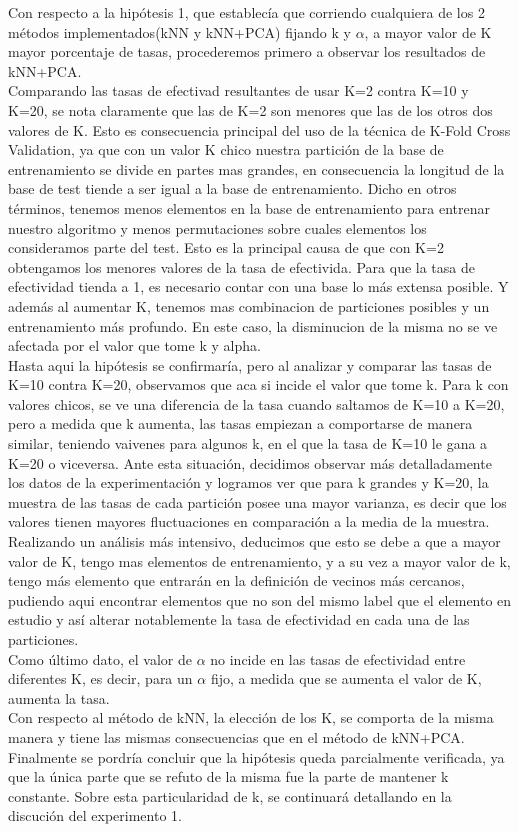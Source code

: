 Con respecto a la hipótesis 1, que establecía que corriendo cualquiera de los 2 métodos implementados(kNN y kNN+PCA) fijando k y $\alpha$, a mayor valor de K mayor porcentaje de tasas, procederemos primero a observar los resultados de kNN+PCA.\\ Comparando las tasas de efectivad resultantes de usar K=2 contra K=10 y K=20, se nota claramente que las de K=2 son menores que las de los otros dos valores de K. Esto es consecuencia principal del uso de la técnica de K-Fold Cross Validation, ya que con un valor K chico nuestra partición de la base de entrenamiento se divide en partes mas grandes, en consecuencia la longitud de la base de test tiende a ser igual a la base de entrenamiento. Dicho en otros términos, tenemos menos elementos en la base de entrenamiento para entrenar nuestro algoritmo y menos permutaciones sobre cuales elementos los consideramos parte del test. Esto es la principal causa de que con K=2 obtengamos los menores valores de la tasa de efectivida. Para que la tasa de efectividad tienda a 1, es necesario contar con una base lo más extensa posible. Y además al aumentar K, tenemos mas combinacion de particiones posibles y un entrenamiento más profundo. En este caso, la disminucion de la misma no se ve afectada por el valor que tome k y alpha. \\Hasta aqui la hipótesis se confirmaría, pero al analizar y comparar las tasas de K=10 contra K=20, observamos que aca si incide el valor que tome k. Para k con valores chicos, se ve una diferencia de la tasa cuando saltamos de K=10 a K=20, pero a medida que k aumenta, las tasas empiezan a comportarse de manera similar, teniendo vaivenes para algunos k, en el que la tasa de K=10 le gana a K=20 o viceversa. Ante esta situación, decidimos observar más detalladamente los datos de la experimentación y logramos ver que para k grandes y K=20, la muestra de las tasas de cada partición posee una mayor varianza, es decir que los valores tienen mayores fluctuaciones en comparación a la media de la muestra. Realizando un análisis más intensivo, deducimos que esto se debe a que a mayor valor de K, tengo mas elementos de entrenamiento, y a su vez a mayor valor de k, tengo más elemento que entrarán en la definición de vecinos más cercanos, pudiendo aqui encontrar elementos que no son del mismo label que el elemento en estudio y así alterar notablemente la tasa de efectividad en cada una de las particiones.\\
Como último dato, el valor de $\alpha$ no incide en las tasas de efectividad entre diferentes K, es decir, para un $\alpha$ fijo, a medida que se aumenta el valor de K, aumenta la tasa.\\
Con respecto al método de kNN, la elección de los K, se comporta de la misma manera y tiene las mismas consecuencias que en el método de kNN+PCA.
Finalmente se pordría concluir que la hipótesis queda parcialmente verificada, ya que la única parte que se refuto de la misma fue la parte de mantener k constante. Sobre esta particularidad de k, se continuará detallando en la discución del experimento 1.

